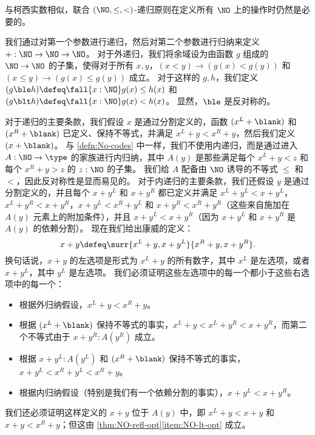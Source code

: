 与柯西实数相似，联合 $(\NO,\le,<)$-递归原则在定义所有 $\NO$ 上的操作时仍然是必要的。

\begin{eg}\label{eg:surreal-addition}
%
我们通过对第一个参数进行递归，然后对第二个参数进行归纳来定义 $\mathord+:\NO\to\NO\to\NO$。
对于外递归，我们将余域设为由函数 $g$ 组成的 $\NO\to\NO$ 的子集，使得对于所有 $x,y$，$(x<y) \to (g(x)<g(y))$ 和 $(x\le y) \to (g(x)\le g(y))$ 成立。
对于这样的 $g,h$，我们定义 $(g\ble h)\defeq \fall{x:\NO} g(x)\le h(x)$ 和 $(g\blt h)\defeq \fall{x:\NO} g(x)< h(x)$。
显然，$\ble$ 是反对称的。

对于递归的主要条款，我们假设 $x$ 是通过分割定义的，函数 $(x^L+\blank)$ 和 $(x^R+\blank)$ 已定义、保持不等式，并满足 $x^L+y<x^R+y$，然后我们定义 $(x+\blank)$。
与 \cref{defn:No-codes} 中一样，我们不使用内递归，而是通过进入 $A:\NO\to\type$ 的家族进行内归纳，其中 $A(y)$ 是那些满足每个 $x^L + y < z$ 和每个 $x^R + y > z$ 的 $z:\NO$ 的子集。
我们给 $A$ 配备由 $\NO$ 诱导的不等式 $\le$ 和 $<$，因此反对称性是显而易见的。
对于内递归的主要条款，我们还假设 $y$ 是通过分割定义的，并且每个 $x+y^L$ 和 $x+y^R$ 都已定义并满足 $x^L+y^L < x+y^L$，$x^L+y^R < x+y^R$，$x+y^L < x^R + y^L$ 和 $x+y^R < x^R+y^R$（这些来自施加在 $A(y)$ 元素上的附加条件），并且 $x+y^L < x+y^R$（因为 $x+y^L$ 和 $x+y^R$ 是 $A(y)$ 的依赖分割）。
现在我们给出康威的定义：
\[ x+y \defeq \surr{x^L+y, x+y^L}{x^R+y,x+y^R}. \]
换句话说，$x+y$ 的左选项是形式为 $x^L+y$ 的所有数字，其中 $x^L$ 是左选项，或者 $x+y^L$，其中 $y^L$ 是左选项。
我们必须证明这些左选项中的每一个都小于这些右选项中的每一个：
\begin{itemize}
  \item 根据外归纳假设，$x^L+y < x^R+y$。
  \item 根据 $(x^L+\blank)$ 保持不等式的事实，$x^L+y < x^L + y^R < x + y^R$，而第二个不等式由于 $x+y^R : A(y^R)$ 成立。
  \item 根据 $x+y^L : A(y^L)$ 和 $(x^R+\blank)$ 保持不等式的事实，$x+y^L < x^R+ y^L < x^R + y$。
  \item 根据内归纳假设（特别是我们有一个依赖分割的事实），$x+y^L < x+y^R$。
\end{itemize}
我们还必须证明这样定义的 $x+y$ 位于 $A(y)$ 中，即 $x^L + y < x+y$ 和 $x+y < x^R + y$；但这由 \cref{thm:NO-refl-opt}\ref{item:NO-lt-opt} 成立。


\end{eg}
